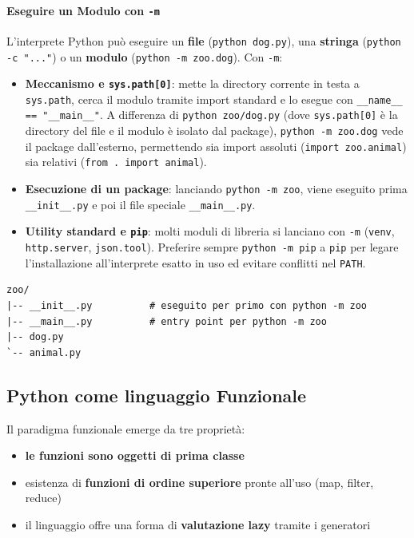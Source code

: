 \documentclass[12pt]{extarticle}
\begin{document}
\paragraph{Eseguire un Modulo con \texttt{-m}}
L'interprete Python può eseguire un \textbf{file} (\texttt{python dog.py}), una \textbf{stringa} (\texttt{python -c "..."}) o un \textbf{modulo} (\texttt{python -m zoo.dog}). Con \texttt{-m}:
\begin{itemize}
    \item \textbf{Meccanismo e \texttt{sys.path[0]}}: mette la directory corrente in testa a \texttt{sys.path}, cerca il modulo tramite import standard e lo esegue con \texttt{\_\_name\_\_ == "\_\_main\_\_"}. A differenza di \texttt{python zoo/dog.py} (dove \texttt{sys.path[0]} è la directory del file e il modulo è isolato dal package), \texttt{python -m zoo.dog} vede il package dall'esterno, permettendo sia import assoluti (\texttt{import zoo.animal}) sia relativi (\texttt{from . import animal}).
    \item \textbf{Esecuzione di un package}: lanciando \texttt{python -m zoo}, viene eseguito prima \texttt{\_\_init\_\_.py} e poi il file speciale \texttt{\_\_main\_\_.py}.
    \item \textbf{Utility standard e \texttt{pip}}: molti moduli di libreria si lanciano con \texttt{-m} (\texttt{venv}, \texttt{http.server}, \texttt{json.tool}). Preferire sempre \texttt{python -m pip} a \texttt{pip} per legare l'installazione all'interprete esatto in uso ed evitare conflitti nel \texttt{PATH}.
\end{itemize}

\begin{lstlisting}[numbers=none]
zoo/
|-- __init__.py          # eseguito per primo con python -m zoo
|-- __main__.py          # entry point per python -m zoo
|-- dog.py
`-- animal.py
\end{lstlisting}

\newpage

\subsection{Python come linguaggio Funzionale}
Il paradigma funzionale emerge da tre proprietà:
\begin{itemize}
    \item \textbf{le funzioni sono oggetti di prima classe}
    \item esistenza di \textbf{funzioni di ordine superiore} pronte all'uso (map, filter, reduce)
    \item il linguaggio offre una forma di \textbf{valutazione lazy} tramite i generatori
\end{itemize}
\end{document}
